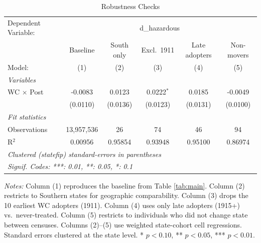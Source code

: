
\begin{table}[htbp]
   \caption{\label{tab:robustness} Robustness Checks}
   \centering
   \begin{tabular}{lccccc}
      \tabularnewline \midrule \midrule
      Dependent Variable: & \multicolumn{5}{c}{d\_hazardous}\\
                        & Baseline   & South only & Excl.\ 1911  & Late adopters & Non-movers \\   
      Model:            & (1)        & (2)        & (3)          & (4)           & (5)\\  
      \midrule
      \emph{Variables}\\
      WC $\times$ Post  & -0.0083    & 0.0123     & 0.0222$^{*}$ & 0.0185        & -0.0049\\   
                        & (0.0110)   & (0.0136)   & (0.0123)     & (0.0131)      & (0.0100)\\   
      \midrule
      \emph{Fit statistics}\\
      Observations      & 13,957,536 & 26         & 74           & 46            & 94\\  
      R$^2$             & 0.00956    & 0.95854    & 0.93948      & 0.95100       & 0.86974\\  
      \midrule \midrule
      \multicolumn{6}{l}{\emph{Clustered (statefip) standard-errors in parentheses}}\\
      \multicolumn{6}{l}{\emph{Signif. Codes: ***: 0.01, **: 0.05, *: 0.1}}\\
   \end{tabular}
   
   \par \raggedright 
   \textit{Notes:} Column (1) reproduces the baseline from Table \ref{tab:main}. Column (2) restricts to Southern states for geographic comparability. Column (3) drops the 10 earliest WC adopters (1911). Column (4) uses only late adopters (1915+) vs.\ never-treated. Column (5) restricts to individuals who did not change state between censuses. Columns (2)--(5) use weighted state-cohort cell regressions. Standard errors clustered at the state level. * $p < 0.10$, ** $p < 0.05$, *** $p < 0.01$.
\end{table}


